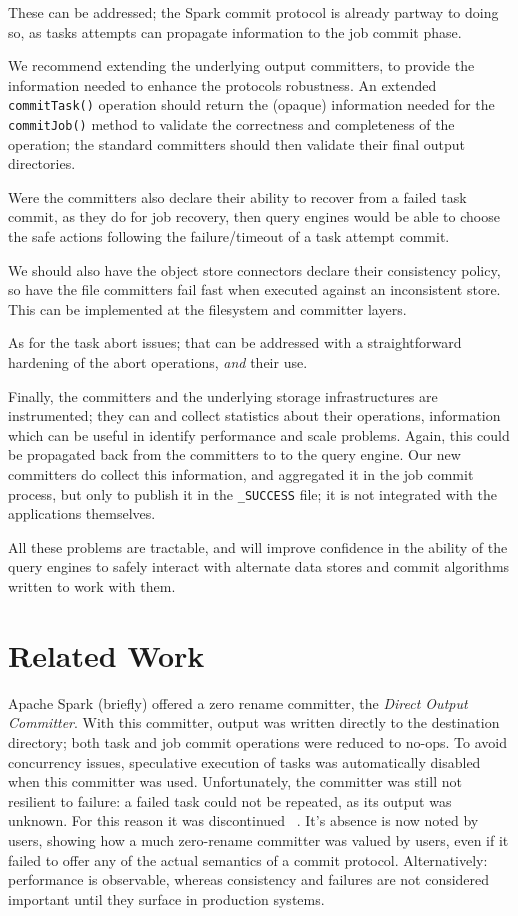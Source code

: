 \documentclass[conference]{IEEEtran}
\begin{document}
These can be addressed;
the Spark commit protocol is already partway to doing so, as tasks attempts
can propagate information to the job commit phase.

We recommend extending the underlying output committers, to provide the
information needed to enhance the protocols robustness.
An extended  \texttt{commitTask()} operation should return the (opaque) information
needed for the \texttt{commitJob()} method to validate the correctness and
completeness of the operation;
the standard committers should then validate their final output directories.

Were the committers also declare their ability to recover from a failed task commit,
as they do for job recovery, then query engines would be able to choose the safe
actions following the failure/timeout of a task attempt commit.

We should also have the object store connectors declare their consistency policy,
so have the file committers fail fast when executed against an inconsistent store.
This can be implemented at the filesystem and committer layers.

As for the task abort issues;
that can be addressed with a straightforward hardening of the abort operations,
\emph{and} their use.

Finally, the committers and the underlying storage infrastructures are instrumented;
they can and collect statistics about their operations, information
which can be useful in identify performance and scale problems.
Again, this could be propagated back from the committers to to the
query engine.
Our new committers do collect this information, and aggregated it in the
job commit process, but only to publish it in the \texttt{_SUCCESS} file;
it is not integrated with the applications themselves.

All these problems are tractable, and will improve confidence in the ability
of the query engines to safely interact with alternate data stores and
commit algorithms written to work with them.



\section{Related Work}
\label{sec:relatedWork}

Apache Spark (briefly) offered a zero rename committer,
the \emph{Direct Output Committer}.
With this committer, output was written directly to the destination directory;
both task and job commit operations were reduced to no-ops.
To avoid concurrency issues, speculative execution of tasks was automatically
disabled when this committer was used.
Unfortunately, the committer was still not resilient to failure: a failed
task could not be repeated, as its output was unknown.
For this reason it was discontinued \ \cite{SPARK-10063}.
It's absence is now noted by users, showing how a much zero-rename committer
was valued by users, even if it failed to offer any of the actual semantics
of a commit protocol.
Alternatively: performance is observable, whereas consistency and failures
are not considered important until they surface in production systems.
\end{document}
